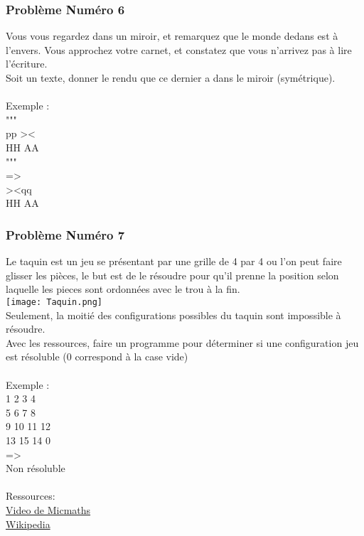\documentclass[12pt]{article}
\begin{document}
\subsubsection{Problème Numéro 6}

Vous vous regardez dans un miroir, et remarquez que le monde dedans est à l'envers. Vous approchez votre carnet, et constatez que vous n'arrivez pas à lire l'écriture.\\
Soit un texte, donner le rendu que ce dernier a dans le miroir (symétrique).
\\\\
Exemple :\\
"""\\
pp \textgreater\textless\\
HH AA\\
"""\\
=\textgreater\\
\textgreater\textless qq\\
HH AA\\

\subsubsection{Problème Numéro 7}

Le taquin est un jeu se présentant par une grille de 4 par 4 ou l'on peut faire glisser les pièces, le but est de le résoudre pour qu'il prenne la position selon laquelle les pieces sont ordonnées avec le trou à la fin.\\
\texttt{[image: Taquin.png]}\\
Seulement, la moitié des configurations possibles du taquin sont impossible à résoudre.\\
Avec les ressources, faire un programme pour déterminer si une configuration jeu est résoluble (0 correspond à la case vide)
\\\\
Exemple :\\
1 2 3 4\\
5 6 7 8\\
9 10 11 12\\
13 15 14 0\\
=\textgreater\\
Non résoluble
\\\\
Ressources:\\
\href{https://www.youtube.com/watch?v=-3IsCOJieCc}{Video de Micmaths}\\
\href{https://fr.wikipedia.org/wiki/Taquin#Configurations_solubles_et_insolubles}{Wikipedia}
\end{document}
